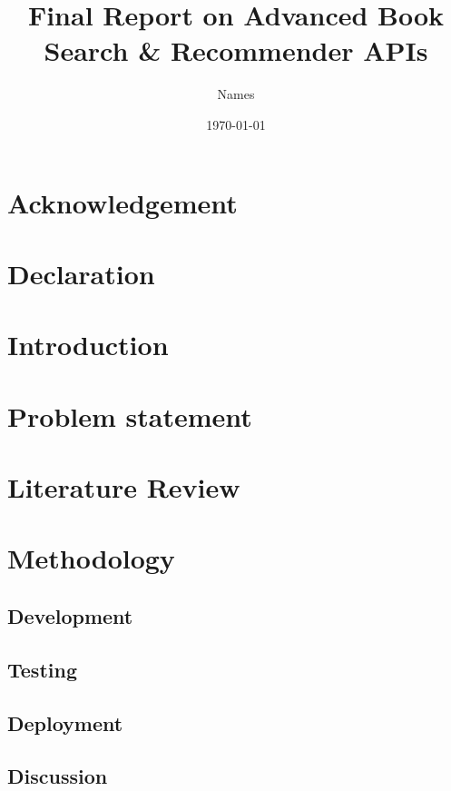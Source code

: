\documentclass{article}
\title{Final Report on Advanced Book Search \& Recommender APIs}
\author{Names}
\date{\today}
\begin{document}
\maketitle

\newpage

\begin{abstract}
    
\end{abstract}

\newpage

\section*{Acknowledgement}
    
\newpage

\section*{Declaration}
    
\newpage

\tableofcontents
\newpage

\section{Introduction}
    

\section{Problem statement}
    

\section{Literature Review}
    

\section{Methodology}
    

\subsection{Development}
    

\subsection{Testing}
    

\subsection{Deployment}
    

\subsection{Discussion}
    
\end{document}

